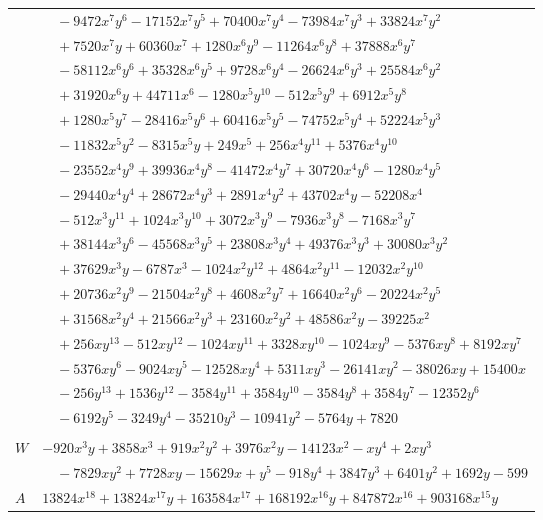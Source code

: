 \documentclass[11pt]{article}
\begin{document}
\begin{longtable}{@{}ll@{}}
 & $\quad -9472x^{7}y^{6}-17152x^{7}y^{5}+70400x^{7}y^{4}-73984x^{7}y^{3}+33824x^{7}y^{2}$\\
 & $\quad +7520x^{7}y+60360x^{7}+1280x^{6}y^{9}-11264x^{6}y^{8}+37888x^{6}y^{7}$\\
 & $\quad -58112x^{6}y^{6}+35328x^{6}y^{5}+9728x^{6}y^{4}-26624x^{6}y^{3}+25584x^{6}y^{2}$\\
 & $\quad +31920x^{6}y+44711x^{6}-1280x^{5}y^{10}-512x^{5}y^{9}+6912x^{5}y^{8}$\\
 & $\quad +1280x^{5}y^{7}-28416x^{5}y^{6}+60416x^{5}y^{5}-74752x^{5}y^{4}+52224x^{5}y^{3}$\\
 & $\quad -11832x^{5}y^{2}-8315x^{5}y+249x^{5}+256x^{4}y^{11}+5376x^{4}y^{10}$\\
 & $\quad -23552x^{4}y^{9}+39936x^{4}y^{8}-41472x^{4}y^{7}+30720x^{4}y^{6}-1280x^{4}y^{5}$\\
 & $\quad -29440x^{4}y^{4}+28672x^{4}y^{3}+2891x^{4}y^{2}+43702x^{4}y-52208x^{4}$\\
 & $\quad -512x^{3}y^{11}+1024x^{3}y^{10}+3072x^{3}y^{9}-7936x^{3}y^{8}-7168x^{3}y^{7}$\\
 & $\quad +38144x^{3}y^{6}-45568x^{3}y^{5}+23808x^{3}y^{4}+49376x^{3}y^{3}+30080x^{3}y^{2}$\\
 & $\quad +37629x^{3}y-6787x^{3}-1024x^{2}y^{12}+4864x^{2}y^{11}-12032x^{2}y^{10}$\\
 & $\quad +20736x^{2}y^{9}-21504x^{2}y^{8}+4608x^{2}y^{7}+16640x^{2}y^{6}-20224x^{2}y^{5}$\\
 & $\quad +31568x^{2}y^{4}+21566x^{2}y^{3}+23160x^{2}y^{2}+48586x^{2}y-39225x^{2}$\\
 & $\quad +256xy^{13}-512xy^{12}-1024xy^{11}+3328xy^{10}-1024xy^{9}-5376xy^{8}+8192xy^{7}$\\
 & $\quad -5376xy^{6}-9024xy^{5}-12528xy^{4}+5311xy^{3}-26141xy^{2}-38026xy+15400x$\\
 & $\quad -256y^{13}+1536y^{12}-3584y^{11}+3584y^{10}-3584y^{8}+3584y^{7}-12352y^{6}$\\
 & $\quad -6192y^{5}-3249y^{4}-35210y^{3}-10941y^{2}-5764y+7820$\\
\addlinespace[3pt]
\multicolumn{2}{@{}l}{$i=4$, $m=48$, neighbours $0,26,27,37,55,56,60,66,67,69,72,75,79$}\\
$W$ & $-920x^{3}y+3858x^{3}+919x^{2}y^{2}+3976x^{2}y-14123x^{2}-xy^{4}+2xy^{3}$\\
 & $\quad -7829xy^{2}+7728xy-15629x+y^{5}-918y^{4}+3847y^{3}+6401y^{2}+1692y-599$\\
$A$ & $13824x^{18}+13824x^{17}y+163584x^{17}+168192x^{16}y+847872x^{16}+903168x^{15}y$\\

\end{longtable}
\end{document}
